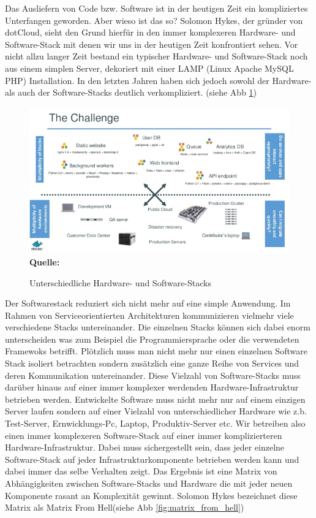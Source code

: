 Das Ausliefern von Code bzw. Software ist in der heutigen Zeit ein kompliziertes Unterfangen geworden. Aber wieso ist das so? Solomon Hykes, der gründer von dotCloud, sieht den Grund hierfür in den immer komplexeren Hardware- und Software-Stack mit denen wir uns in der heutigen Zeit konfrontiert sehen. \cite{hykes_introduction_2013} 
Vor nicht allzu langer Zeit bestand ein typischer Hardware- und Software-Stack noch aus einem simplen Server, dekoriert mit einer LAMP (Linux Apache MySQL PHP) Installation.
In den letzten Jahren haben sich jedoch sowohl der Hardware- als auch der Software-Stacks deutlich verkompliziert. (siehe Abb \ref{fig:hardware_software_stack}) 
\begin{figure}[htbp]
  \centering  
  \includegraphics[scale=0.6]{img/hardware_software_stack.jpg}\\
  \footnotesize\sffamily\textbf{Quelle:} \cite{hykes_docker_2013}
  \caption{Unterschiedliche Hardware- und Software-Stacks}
  \label{fig:hardware_software_stack}
\end{figure}
Der Softwarestack reduziert sich nicht mehr auf eine simple Anwendung. Im Rahmen von Serviceorientierten Architekturen kommunizieren vielmehr viele verschiedene Stacks untereinander. Die einzelnen Stacks können sich dabei enorm unterscheiden was zum Beispiel die Programmiersprache oder die verwendeten Framewoks betrifft.
Plötzlich muss man nicht mehr nur einen einzelnen Software Stack isoliert betrachten sondern zusätzlich eine ganze Reihe von Services und deren Kommunikation untereinander.
Diese Vielzahl von Software-Stacks muss darüber hinaus auf einer immer komplexer werdenden Hardware-Infrastruktur betrieben werden. Entwickelte Software muss nicht mehr nur auf einem einzigen Server laufen sondern auf einer Vielzahl von unterschiedlicher Hardware wie z.b. Test-Server, Ernwicklungs-Pc, Laptop, Produktiv-Server etc.
Wir betreiben also einen immer komplexeren Software-Stack auf einer immer komplizierteren Hardware-Infrastruktur. Dabei muss sichergestellt sein, dass jeder einzelne Software-Stack auf jeder Infrastrukturkomponente betrieben werden kann und dabei immer das selbe Verhalten zeigt.
Das Ergebnis ist eine Matrix von Abhängigkeiten zwischen Software-Stacks und Hardware die mit jeder neuen Komponente rasant an Komplexität gewinnt.
Solomon Hykes bezeichnet diese Matrix als \glqq Matrix From Hell\grqq \cite[Zeit 4:30]{hykes_introduction_2013}(siehe Abb \ref{fig:matrix_from_hell}) 

